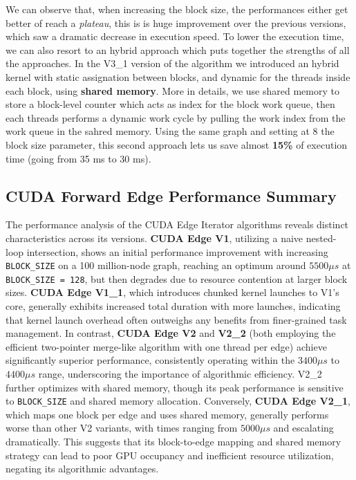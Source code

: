 \documentclass{aes2e}
\begin{document}
We can observe that, when increasing the block size, the performances either get better of reach a \textit{plateau}, this is is huge improvement over the previous versions, which saw a dramatic decrease in execution speed.
To lower the execution time, we can also resort to an hybrid approach which puts together the strengths of all the approaches.
In the V3\_1 version of the algorithm we introduced an hybrid kernel with static assignation between blocks, and dynamic for the threads inside each block, using \textbf{shared memory}. More in details, we use shared memory to store a block-level counter which acts as index for the block work queue, then each threads performs a dynamic work cycle by pulling the work index from the work queue in the sahred memory. Using the same graph and setting at 8 the block size parameter, this second approach lets us save almost \textbf{15\%} of execution time (going from 35 ms to 30 ms).
\subsection{CUDA Forward Edge Performance Summary}
The performance analysis of the CUDA Edge Iterator algorithms reveals distinct characteristics across its versions. \textbf{CUDA Edge V1}, utilizing a naive nested-loop intersection, shows an initial performance improvement with increasing \texttt{BLOCK\_SIZE} on a 100 million-node graph, reaching an optimum around $5500 \mu s$ at \texttt{BLOCK\_SIZE = 128}, but then degrades due to resource contention at larger block sizes. \textbf{CUDA Edge V1\_1}, which introduces chunked kernel launches to V1's core, generally exhibits increased total duration with more launches, indicating that kernel launch overhead often outweighs any benefits from finer-grained task management. In contrast, \textbf{CUDA Edge V2} and \textbf{V2\_2} (both employing the efficient two-pointer merge-like algorithm with one thread per edge) achieve significantly superior performance, consistently operating within the $3400 \mu s$ to $4400 \mu s$ range, underscoring the importance of algorithmic efficiency. V2\_2 further optimizes with shared memory, though its peak performance is sensitive to \texttt{BLOCK\_SIZE} and shared memory allocation. Conversely, \textbf{CUDA Edge V2\_1}, which maps one block per edge and uses shared memory, generally performs worse than other V2 variants, with times ranging from $5000 \mu s$ and escalating dramatically. This suggests that its block-to-edge mapping and shared memory strategy can lead to poor GPU occupancy and inefficient resource utilization, negating its algorithmic advantages.
\end{document}
